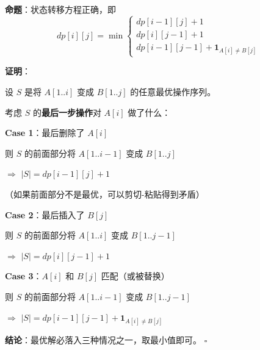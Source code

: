 \documentclass[12pt, a4paper]{ctexart}
\begin{document}
\begin{blackboard}[编辑距离状态转移的证明]

\textbf{命题}：状态转移方程正确，即
\[
dp[i][j] = \min \begin{cases}
dp[i-1][j] + 1 \\
dp[i][j-1] + 1 \\
dp[i-1][j-1] + \mathbf{1}_{A[i] \neq B[j]}
\end{cases}
\]

\textbf{证明}：

设 $S$ 是将 $A[1..i]$ 变成 $B[1..j]$ 的任意最优操作序列。

考虑 $S$ 的\textbf{最后一步操作}对 $A[i]$ 做了什么：

\textbf{Case 1}：最后删除了 $A[i]$

则 $S$ 的前面部分将 $A[1..i-1]$ 变成 $B[1..j]$

$\Rightarrow$ $|S| = dp[i-1][j] + 1$

（如果前面部分不是最优，可以剪切-粘贴得到矛盾）

\textbf{Case 2}：最后插入了 $B[j]$

则 $S$ 的前面部分将 $A[1..i]$ 变成 $B[1..j-1]$

$\Rightarrow$ $|S| = dp[i][j-1] + 1$

\textbf{Case 3}：$A[i]$ 和 $B[j]$ 匹配（或被替换）

则 $S$ 的前面部分将 $A[1..i-1]$ 变成 $B[1..j-1]$

$\Rightarrow$ $|S| = dp[i-1][j-1] + \mathbf{1}_{A[i] \neq B[j]}$

\textbf{结论}：最优解必落入三种情况之一，取最小值即可。 $\square$

\end{blackboard}
\end{document}
